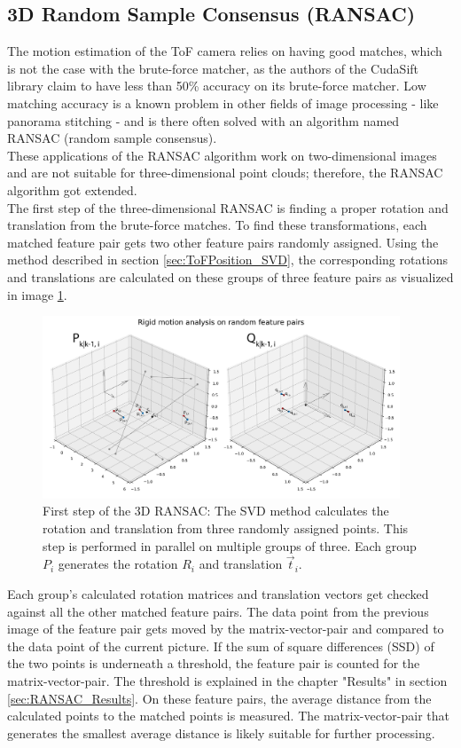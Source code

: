 \subsection{3D Random Sample Consensus (RANSAC)}
\label{sec:ToFPosition_RANSAC}
The motion estimation of the ToF camera relies on having good matches, which is not the case with the brute-force matcher, as the authors of the CudaSift library claim to have less than 50\% accuracy on its brute-force matcher.\cite{cudaSiftRepo} Low matching accuracy is a known problem in other fields of image processing - like panorama stitching - and is there often solved with an algorithm named RANSAC (random sample consensus).\\
These applications of the RANSAC algorithm work on two-dimensional images and are not suitable for three-dimensional point clouds; therefore, the RANSAC algorithm got extended.\\
The first step of the three-dimensional RANSAC is finding a proper rotation and translation from the brute-force matches. To find these transformations, each matched feature pair gets two other feature pairs randomly assigned. Using the method described in section \ref{sec:ToFPosition_SVD}, the corresponding rotations and translations are calculated on these groups of three feature pairs as visualized in image \ref{im:ransac1}.
\begin{figure}[H]
    \centering
    \includegraphics[width=0.95\textwidth]{images/ransac_3d_step1.pdf}
    \caption{First step of the 3D RANSAC: The SVD method calculates the rotation and translation from three randomly assigned points. This step is performed in parallel on multiple groups of three. Each group $P_{i}$ generates the rotation $R_{i}$ and translation $\vec{t}_{i}$.}
    \label{im:ransac1}
\end{figure}
Each group's calculated rotation matrices and translation vectors get checked against all the other matched feature pairs. The data point from the previous image of the feature pair gets moved by the matrix-vector-pair and compared to the data point of the current picture. If the sum of square differences (SSD) of the two points is underneath a threshold, the feature pair is counted for the matrix-vector-pair. The threshold is explained in the chapter "Results" in section \ref{sec:RANSAC_Results}. On these feature pairs, the average distance from the calculated points to the matched points is measured. The matrix-vector-pair that generates the smallest average distance is likely suitable for further processing.

